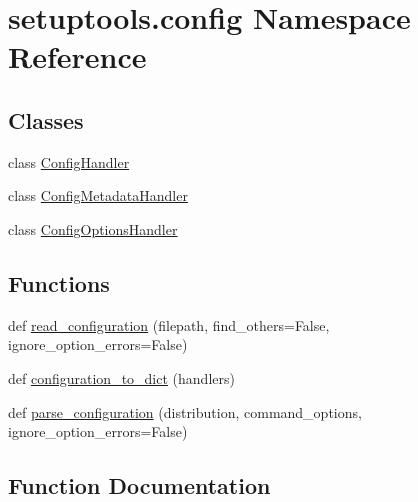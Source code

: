 \hypertarget{namespacesetuptools_1_1config}{}\section{setuptools.\+config Namespace Reference}
\label{namespacesetuptools_1_1config}
\subsection*{Classes}
\begin{DoxyCompactItemize}
\item 
class \hyperlink{classsetuptools_1_1config_1_1_config_handler}{Config\+Handler}
\item 
class \hyperlink{classsetuptools_1_1config_1_1_config_metadata_handler}{Config\+Metadata\+Handler}
\item 
class \hyperlink{classsetuptools_1_1config_1_1_config_options_handler}{Config\+Options\+Handler}
\end{DoxyCompactItemize}
\subsection*{Functions}
\begin{DoxyCompactItemize}
\item 
def \hyperlink{namespacesetuptools_1_1config_a2cadac39b3e9811ccf02204b63586fc9}{read\+\_\+configuration} (filepath, find\+\_\+others=False, ignore\+\_\+option\+\_\+errors=False)
\item 
def \hyperlink{namespacesetuptools_1_1config_a0e9032aade7fdb7c979274ed8f89ba3d}{configuration\+\_\+to\+\_\+dict} (handlers)
\item 
def \hyperlink{namespacesetuptools_1_1config_a2c2e6e2aaa466506a52dec243e695eb6}{parse\+\_\+configuration} (distribution, command\+\_\+options, ignore\+\_\+option\+\_\+errors=False)
\end{DoxyCompactItemize}


\subsection{Function Documentation}
\mbox{\label{namespacesetuptools_1_1config_a0e9032aade7fdb7c979274ed8f89ba3d}} 
